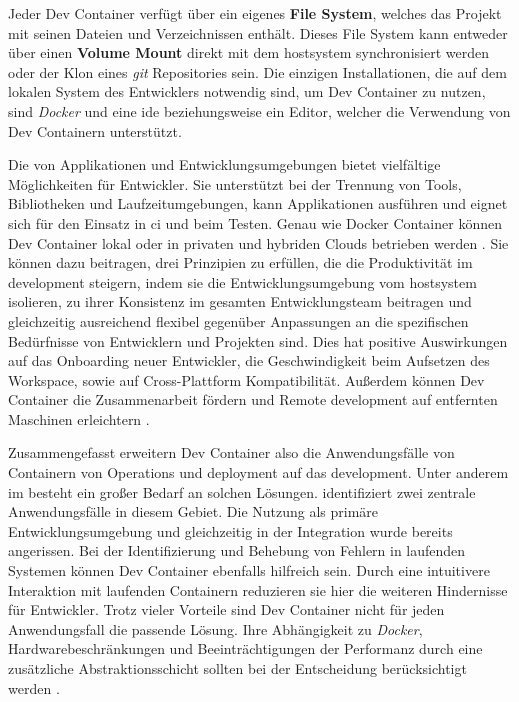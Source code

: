 Jeder Dev Container verfügt über ein eigenes \textbf{File System}, welches das Projekt mit seinen Dateien und Verzeichnissen enthält. Dieses File System kann entweder über einen \textbf{Volume Mount} direkt mit dem \Gls{hostsystem} synchronisiert werden oder der Klon eines \textit{\Gls{git}} Repositories sein. Die einzigen Installationen, die auf dem lokalen System des Entwicklers notwendig sind, um Dev Container zu nutzen, sind \textit{Docker} und eine \Gls{ide} beziehungsweise ein Editor, welcher die Verwendung von Dev Containern unterstützt.

Die  von Applikationen und Entwicklungsumgebungen bietet vielfältige Möglichkeiten für Entwickler. Sie unterstützt bei der Trennung von Tools, Bibliotheken und Laufzeitumgebungen, kann Applikationen ausführen und eignet sich für den Einsatz in \acrfull{ci} und beim Testen. Genau wie Docker Container können Dev Container lokal oder in privaten und hybriden Clouds betrieben werden \cite{306:Development-Containers}. Sie können dazu beitragen, drei Prinzipien zu erfüllen, die die Produktivität im \Gls{development} steigern, indem sie die Entwicklungsumgebung vom \Gls{hostsystem} isolieren, zu ihrer Konsistenz im gesamten Entwicklungsteam beitragen und gleichzeitig ausreichend flexibel gegenüber Anpassungen an die spezifischen Bedürfnisse von Entwicklern und Projekten sind. Dies hat positive Auswirkungen auf das Onboarding neuer Entwickler, die Geschwindigkeit beim Aufsetzen des Workspace, sowie auf Cross-Plattform Kompatibilität. Außerdem können Dev Container die Zusammenarbeit fördern und Remote \Gls{development} auf entfernten Maschinen erleichtern \cite{200:Dev-Containers-Future-of-Development-Environments,202:Maximizing-Efficiency-with-Dev-Containers,305:Using-DevContainers-in-JetBrains-IDEs}.

Zusammengefasst erweitern Dev Container also die Anwendungsfälle von Containern von Operations und \Gls{deployment} auf das \Gls{development}. Unter anderem im  besteht ein großer Bedarf an solchen Lösungen. \citeauthor{202:Maximizing-Efficiency-with-Dev-Containers} identifiziert zwei zentrale Anwendungsfälle in diesem Gebiet. Die Nutzung als primäre Entwicklungsumgebung und gleichzeitig in der Integration wurde bereits angerissen. Bei der Identifizierung und Behebung von Fehlern in laufenden Systemen können Dev Container ebenfalls hilfreich sein. Durch eine intuitivere Interaktion mit laufenden Containern reduzieren sie hier die weiteren Hindernisse für Entwickler. Trotz vieler Vorteile sind Dev Container nicht für jeden Anwendungsfall die passende Lösung. Ihre Abhängigkeit zu \textit{Docker}, Hardwarebeschränkungen und Beeinträchtigungen der Performanz durch eine zusätzliche Abstraktionsschicht sollten bei der Entscheidung berücksichtigt werden \cite{202:Maximizing-Efficiency-with-Dev-Containers}.

